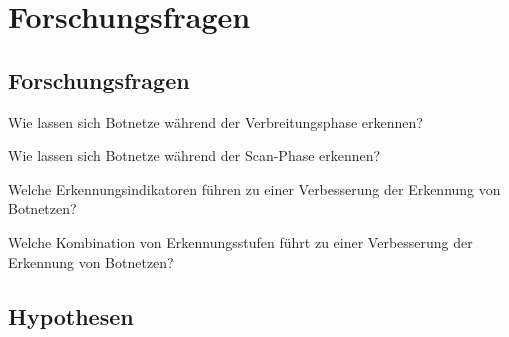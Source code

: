 \section{Forschungsfragen}
\subsection*{Forschungsfragen}


\begin{questions}
    \item Wie lassen sich Botnetze während der Verbreitungsphase erkennen?
    \item Wie lassen sich Botnetze während der Scan-Phase erkennen?
    \item Welche Erkennungsindikatoren führen zu einer Verbesserung der Erkennung von Botnetzen?
    \item Welche Kombination von Erkennungsstufen führt zu einer Verbesserung der Erkennung von Botnetzen?
\end{questions}

\subsection*{Hypothesen}


\begin{hypotheses}
    \item
\end{hypotheses}